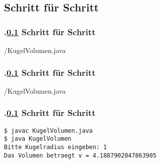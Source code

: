 \def\stitle{Schritt f\"ur Schritt}%
\subsection{\stitle}\label{S:SchrittSchritt}
\begin{frame}[t]%
  \frametitle{\kap.\ref{S:SchrittSchritt} \stitle}%



{\getexercisefolder/KugelVolumen.java}

\end{frame}


\def\stitle{Schritt f\"ur Schritt}%
\begin{frame}[t]%
  \frametitle{\kap.\ref{S:SchrittSchritt} \stitle}%


{\getexercisefolder/KugelVolumen.java}

\end{frame}


\def\stitle{Schritt f\"ur Schritt}%
\begin{frame}[fragile]%
  \frametitle{\kap.\ref{S:SchrittSchritt} \stitle}%
\medskip

\begin{lstlisting}[title={Um das Programm \code{KugelVolumen} auszuf\"uhren werden folgende Schritte auf dem Terminal durchgef\"uhrt.},style=BASH]
$ javac KugelVolumen.java
$ java KugelVolumen
Bitte Kugelradius eingeben: 1
Das Volumen betraegt v = 4.1887902047863905
\end{lstlisting}

\end{frame}
